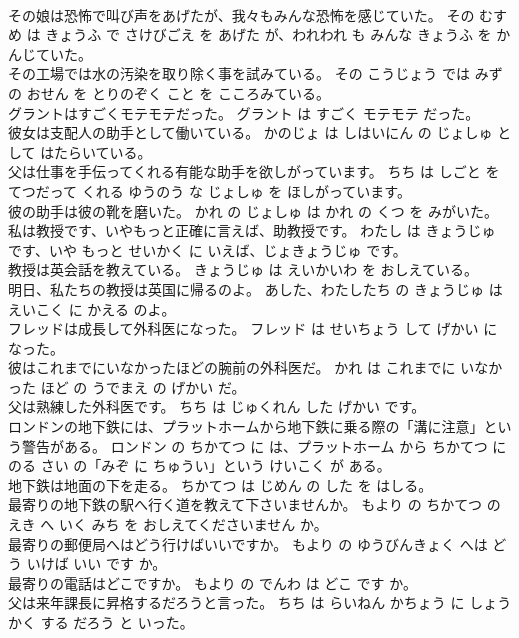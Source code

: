 \documentclass[8pt]{extreport}
\begin{document}
\begin{CJK}{UTF8}{min}
\\	その娘は恐怖で叫び声をあげたが、我々もみんな恐怖を感じていた。	その むすめ は きょうふ で さけびごえ を あげた が、われわれ も みんな きょうふ を かんじていた。	
\\	その工場では水の汚染を取り除く事を試みている。	その こうじょう では みず の おせん を とりのぞく こと を こころみている。	
\\	グラントはすごくモテモテだった。	グラント は すごく モテモテ だった。	
\\	彼女は支配人の助手として働いている。	かのじょ は しはいにん の じょしゅ として はたらいている。	
\\	父は仕事を手伝ってくれる有能な助手を欲しがっています。	ちち は しごと を てつだって くれる ゆうのう な じょしゅ を ほしがっています。	
\\	彼の助手は彼の靴を磨いた。	かれ の じょしゅ は かれ の くつ を みがいた。	
\\	私は教授です、いやもっと正確に言えば、助教授です。	わたし は きょうじゅ です、いや もっと せいかく に いえば、じょきょうじゅ です。	
\\	教授は英会話を教えている。	きょうじゅ は えいかいわ を おしえている。	
\\	明日、私たちの教授は英国に帰るのよ。	あした、わたしたち の きょうじゅ は えいこく に かえる のよ。	
\\	フレッドは成長して外科医になった。	フレッド は せいちょう して げかい に なった。	
\\	彼はこれまでにいなかったほどの腕前の外科医だ。	かれ は これまでに いなかった ほど の うでまえ の げかい だ。	
\\	父は熟練した外科医です。	ちち は じゅくれん した げかい です。	
\\	ロンドンの地下鉄には、プラットホームから地下鉄に乗る際の「溝に注意」という警告がある。	ロンドン の ちかてつ に は、プラットホーム から ちかてつ に のる さい の「みぞ に ちゅうい」という けいこく が ある。	
\\	地下鉄は地面の下を走る。	ちかてつ は じめん の した を はしる。	
\\	最寄りの地下鉄の駅へ行く道を教えて下さいませんか。	もより の ちかてつ の えき へ いく みち を おしえてくださいません か。	
\\	最寄りの郵便局へはどう行けばいいですか。	もより の ゆうびんきょく へは どう いけば いい です か。	
\\	最寄りの電話はどこですか。	もより の でんわ は どこ です か。	
\\	父は来年課長に昇格するだろうと言った。	ちち は らいねん かちょう に しょうかく する だろう と いった。	

\end{CJK}
\end{document}
